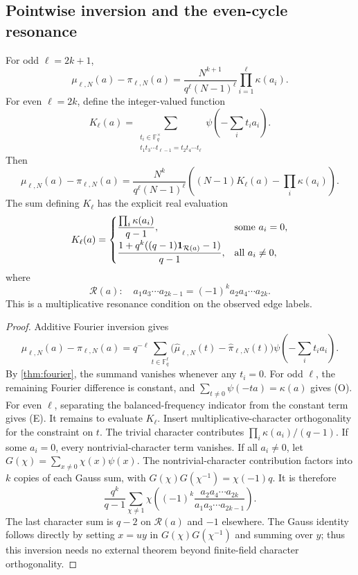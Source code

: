 \subsection{Pointwise inversion and the even-cycle resonance}
\begin{theorem}\label{thm:pmf}
For odd $\ell=2k+1$,
\[
 \mu_{\ell,N}(a)-\pi_{\ell,N}(a)
 =\frac{N^{k+1}}{q^\ell(N-1)^\ell}\prod_{i=1}^\ell\kappa(a_i).
\tag{O}\label{eq:odd-pmf}
\]
For even $\ell=2k$, define the integer-valued function
\[
 K_\ell(a)=
 \sum_{\substack{t_i\in\mathbb F_q^\times\\
 t_1t_3\cdots t_{\ell-1}=t_2t_4\cdots t_\ell}}
 \psi\left(-\sum_i t_ia_i\right).
\]
Then
\[
 \mu_{\ell,N}(a)-\pi_{\ell,N}(a)
 =\frac{N^k}{q^\ell(N-1)^\ell}
 \left((N-1)K_\ell(a)-\prod_i\kappa(a_i)\right).
\tag{E}\label{eq:even-pmf}
\]
The sum defining $K_\ell$ has the explicit real evaluation
\[
 K_\ell(a)=\begin{cases}
 \displaystyle\frac{\prod_i\kappa(a_i)}{q-1},
     &\text{some }a_i=0,\\[6pt]
 \displaystyle\frac{1+q^k((q-1){\bf1}_{\mathcal R(a)}-1)}{q-1},
     &\text{all }a_i\ne0,
 \end{cases}
\]
where
\[
 \mathcal R(a):\quad
 a_1a_3\cdots a_{2k-1}=(-1)^k a_2a_4\cdots a_{2k}.
\]
This is a multiplicative resonance condition on the observed edge labels.

\end{theorem}
\begin{proof}
Additive Fourier inversion gives
\[
 \mu_{\ell,N}(a)-\pi_{\ell,N}(a)
 =q^{-\ell}\sum_{t\in\mathbb F_q^\ell}
 \bigl(\widehat\mu_{\ell,N}(t)-\widehat\pi_{\ell,N}(t)\bigr)
 \psi\left(-\sum_i t_i a_i\right).
\]
By \cref{thm:fourier}, the summand vanishes whenever any $t_i=0$.
For odd $\ell$, the remaining Fourier difference is constant, and
$\sum_{t\ne0}\psi(-ta)=\kappa(a)$ gives (O).
For even $\ell$, separating the balanced-frequency indicator from the
constant term gives (E). It remains to evaluate $K_\ell$.
Insert multiplicative-character orthogonality for the constraint on $t$.
The trivial character contributes $\prod_i\kappa(a_i)/(q-1)$.
If some $a_i=0$, every nontrivial-character term vanishes.
If all $a_i\ne0$, let $G(\chi)=\sum_{x\ne0}\chi(x)\psi(x)$.
The nontrivial-character contribution factors into $k$ copies of each
Gauss sum, with
$G(\chi)G(\chi^{-1})=\chi(-1)q$.
It is therefore
\[
 \frac{q^k}{q-1}\sum_{\chi\ne1}
 \chi\left((-1)^k\frac{a_2a_4\cdots a_{2k}}{a_1a_3\cdots a_{2k-1}}\right).
\]
The last character sum is $q-2$ on $\mathcal R(a)$ and $-1$ elsewhere.
The Gauss identity follows directly by setting $x=uy$ in
$G(\chi)G(\chi^{-1})$ and summing over $y$; thus this inversion needs no
external theorem beyond finite-field character orthogonality.
\end{proof}

